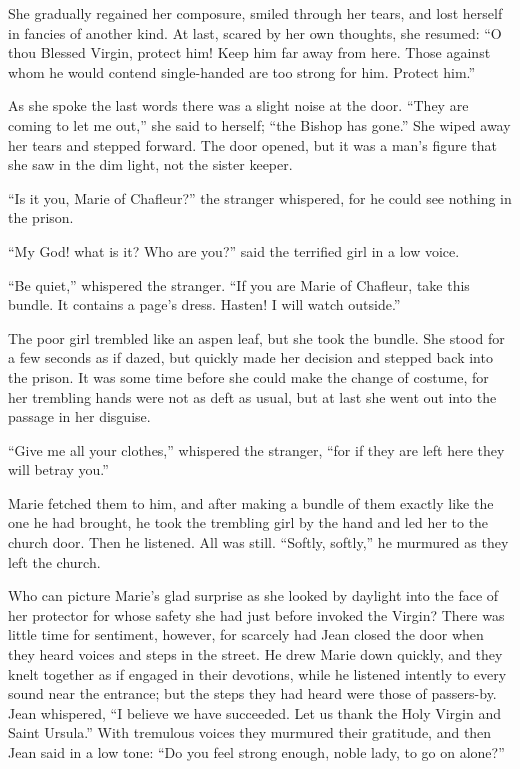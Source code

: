 She gradually regained her composure, smiled through her tears, and lost
herself in fancies of another kind. At last, scared by her own thoughts,
she resumed: ``O thou Blessed Virgin, protect him! Keep him far away
from here. Those against whom he would contend single-handed are too
strong for him. Protect him.''

As she spoke the last words there was a slight noise at the door. ``They
are coming to let me out,'' she said to herself; ``the Bishop has
gone.'' She wiped away her tears and stepped forward. The door opened,
but it was a man's figure that she saw in the dim light, not the sister
keeper.

``Is it you, Marie of Chafleur?'' the stranger whispered, for he could
see nothing in the prison.

``My God! what is it? Who are you?'' said the terrified girl in a low
voice.

``Be quiet,'' whispered the stranger. ``If you are Marie of Chafleur,
take this bundle. It contains a page's dress. Hasten! I will watch
outside.''

The poor girl trembled like an aspen leaf, but she took the bundle. She
stood for a few seconds as if dazed, but quickly made her decision and
stepped back into the prison. It was some time before she could make the
change of costume, for her trembling hands were not as deft as usual,
but at last she went out into the passage in her disguise.

``Give me all your clothes,'' whispered the stranger, ``for if they are
left here they will betray you.''

Marie fetched them to him, and after making a bundle of them exactly
like the one he had brought, he took the trembling girl by the hand and
led her to the church door. Then he listened. All was still. ``Softly,
softly,'' he murmured as they left the church.

Who can picture Marie's glad surprise as she looked by daylight into the
face of her protector for whose safety she had just before invoked the
Virgin? There was little time for sentiment, however, for scarcely had
Jean closed the door when they heard voices and steps in the street. He
drew Marie down quickly, and they knelt together as if engaged in their
devotions, while he listened intently to every sound near the entrance;
but the steps they had heard were those of passers-by. Jean whispered,
``I believe we have succeeded. Let us thank the Holy Virgin and Saint
Ursula.'' With tremulous voices they murmured their gratitude, and then
Jean said in a low tone: ``Do you feel strong enough, noble lady, to go
on alone?''

